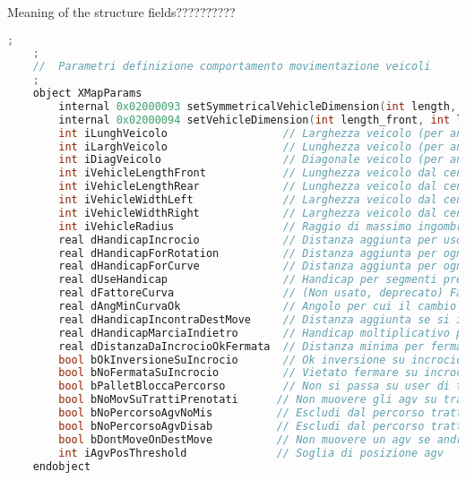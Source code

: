Meaning of the structure fields??????????
\begin{lstlisting}[language=c++,caption= XMapParams, label=lstXMapParams]
	;
	;
	//	Parametri definizione comportamento movimentazione veicoli
	;
	object XMapParams
		internal 0x02000093 setSymmetricalVehicleDimension(int length, int width, int diagonal=0)
		internal 0x02000094 setVehicleDimension(int length_front, int length_rear, int width_left, int width_right, int radius = 0)
		int iLunghVeicolo                  // Larghezza veicolo (per anticollisione)
		int iLarghVeicolo                  // Lunghezza veicolo (per anticollisione)
		int iDiagVeicolo                   // Diagonale veicolo (per anticollisione, autocalcolata se == 0)
		int iVehicleLengthFront            // Lunghezza veicolo dal centro in avanti (per anticollisione)
		int iVehicleLengthRear             // Lunghezza veicolo dal centro all'indietro (per anticollisione)
		int iVehicleWidthLeft              // Larghezza veicolo dal centro verso sinistra (per anticollisione)
		int iVehicleWidthRight             // Larghezza veicolo dal centro verso destra (per anticollisione)
		int iVehicleRadius                 // Raggio di massimo ingombro durante rotazione (per anticollisione)
		real dHandicapIncrocio             // Distanza aggiunta per uso incrocio (DEPRECATO)
		real dHandicapForRotation          // Distanza aggiunta per ogni rotazione
		real dHandicapForCurve             // Distanza aggiunta per ogni curva
		real dUseHandicap                  // Handicap per segmenti prenotati in senso contrario
		real dFattoreCurva                 // (Non usato, deprecato) Fattore moltiplicativo dell'ingombro in caso di curva
		real dAngMinCurvaOk                // Angolo per cui il cambio di corridoio e' possibile con una rotazione anche se c'e' divieto di ingombro dei quadranti (cambio verso)
		real dHandicapIncontraDestMove     // Distanza aggiunta se si incontra un veicolo fermo. Se negativa non si passa proprio (ricerca di un percorso alternativo)
		real dHandicapMarciaIndietro       // Handicap moltiplicativo per tratti a marcia indietro
		real dDistanzaDaIncrocioOkFermata  // Distanza minima per fermata prima o dopo un incrocio in prenotazione movimento
		bool bOkInversioneSuIncrocio       // Ok inversione su incrocio
		bool bNoFermataSuIncrocio          // Vietato fermare su incrocio
		bool bPalletBloccaPercorso         // Non si passa su user di tipo 'C' occupato
		bool bNoMovSuTrattiPrenotati      // Non muovere gli agv su tratti prenotati da altri agv
		bool bNoPercorsoAgvNoMis          // Escludi dal percorso tratti su cui si trovano agv non in missione
		bool bNoPercorsoAgvDisab          // Escludi dal percorso tratti su cui si trovano agv disabilitati (e non in missione)
		bool bDontMoveOnDestMove          // Non muovere un agv se andrebbe a finire sulla destinazione di un altro agv
		int iAgvPosThreshold              // Soglia di posizione agv
	endobject
\end{lstlisting}
%
